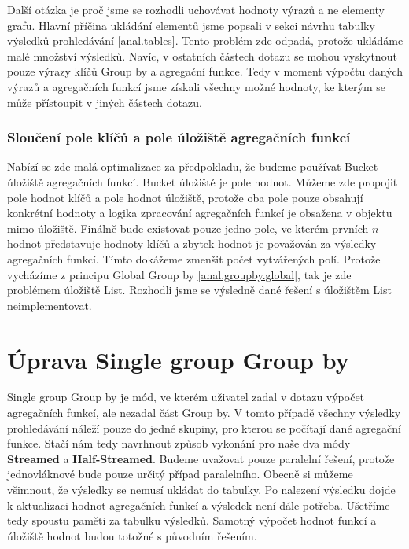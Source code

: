 Další otázka je proč jsme se rozhodli uchovávat hodnoty výrazů a ne elementy grafu.
Hlavní příčina ukládání elementů jsme popsali v sekci návrhu tabulky výsledků prohledávání \ref{anal.tables}.
Tento problém zde odpadá, protože ukládáme malé množství výsledků.
Navíc, v ostatních částech dotazu se mohou vyskytnout pouze výrazy klíčů Group by a agregační funkce.
Tedy v moment výpočtu daných výrazů a agregačních funkcí jsme získali všechny možné hodnoty, ke kterým se může přístoupit v jiných částech dotazu. 

\subsubsection{Sloučení pole klíčů a pole úložiště agregačních funkcí}

Nabízí se zde malá optimalizace za předpokladu, že budeme používat Bucket úložiště agregačních funkcí.
Bucket úložiště je pole hodnot.
Můžeme zde propojit pole hodnot klíčů a pole hodnot úložiště, protože oba pole pouze obsahují konkrétní hodnoty a logika zpracování agregačních funkcí je obsažena v objektu mimo úložiště.
Finálně bude existovat pouze jedno pole, ve kterém prvních $n$ hodnot představuje hodnoty klíčů a zbytek hodnot je považován za výsledky agregačních funkcí.
Tímto dokážeme zmenšit počet vytvářených polí.
Protože vycházíme z principu Global Group by \ref{anal.groupby.global}, tak je zde problémem úložiště List.
Rozhodli jsme se výsledně dané řešení s úložištěm List neimplementovat.


\section{Úprava Single group Group by} \label{anal.improvement.singlegroup}

Single group Group by je mód, ve kterém uživatel zadal v dotazu výpočet agregačních funkcí, ale nezadal část Group by.
V tomto případě všechny výsledky prohledávání náleží pouze do jedné skupiny, pro kterou se počítají dané agregační funkce.
Stačí nám tedy navrhnout způsob vykonání pro naše dva módy \textbf{Streamed} a \textbf{Half-Streamed}.
Budeme uvažovat pouze paralelní řešení, protože jednovláknové bude pouze určitý případ paralelního.
Obecně si můžeme všimnout, že výsledky se nemusí ukládat do tabulky.
Po nalezení výsledku dojde k aktualizaci hodnot agregačních funkcí a výsledek není dále potřeba.
Ušetříme tedy spoustu paměti za tabulku výsledků.
Samotný výpočet hodnot funkcí a úložiště hodnot budou totožné s původním řešením.

